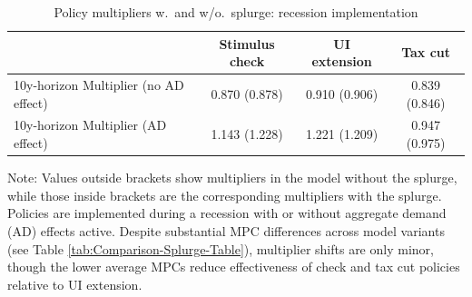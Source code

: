 \documentclass{econsocart}
\begin{document}
\begin{table}[tb] 
  \caption{\pregenmark Policy multipliers w.\ and w/o.\ splurge: recession implementation}
  \label{tab:Multiplier-SplurgeComp} %
  \centering

  \begin{tabular*}
    {\textwidth}{@{\extracolsep{\fill}}lccc@{}}
    \hline
    & Stimulus check & UI extension & Tax cut \\ \hline
    10y-horizon Multiplier (no AD effect) & 0.870 (0.878) & 0.910 (0.906) & 0.839 (0.846) \\
    10y-horizon Multiplier (AD effect)    & 1.143 (1.228) & 1.221 (1.209) & 0.947 (0.975) \\
    \hline
  \end{tabular*}

  \noindent\parbox{\textwidth}{
    \medskip
    \footnotesize Note: Values outside brackets show multipliers in the model without the splurge, while those inside brackets are the corresponding multipliers with the splurge. Policies are implemented during a recession with or without aggregate demand (AD) effects active. Despite substantial MPC differences across model variants (see Table \ref{tab:Comparison-Splurge-Table}), multiplier shifts are only minor, though the lower average MPCs reduce effectiveness of check and tax cut policies relative to UI extension.
  }
\end{table}

\vspace{0.5em}
\end{document}
